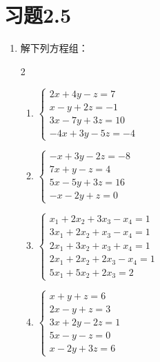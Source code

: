 \section*{习题2.5}
\begin{enumerate}
    \item 解下列方程组：
\begin{multicols}{2}
\begin{enumerate}
    \item $\begin{cases}
2x+4y-z=7\\
x-y+2z=-1\\
3x-7y+3z=10\\
-4x+3y-5z=-4        
    \end{cases}$
    \item $\begin{cases}
-x+3y-2z=-8\\
7x+y-z=4\\ 5x-5y+3z=16\\ -x-2y+z=0        
    \end{cases}$
    \item $\begin{cases}
 x_1+2x_2+3x_3-x_4=1\\
3x_1+2x_2+x_3-x_4=1\\
2x_1+3x_2+x_3+x_4=1\\
2x_1 +2x_2+2x_3-x_4=1\\
5x_1+5x_2+2x_3 =2     
    \end{cases}$
    \item $\begin{cases}
        x+y+z=6\\
        2x-y+z=3\\
        3x+2y-2z=1\\
        5x-y-z=0\\
        x-2y+3z=6        
    \end{cases}$
\end{enumerate}
\end{multicols}



\end{enumerate}
